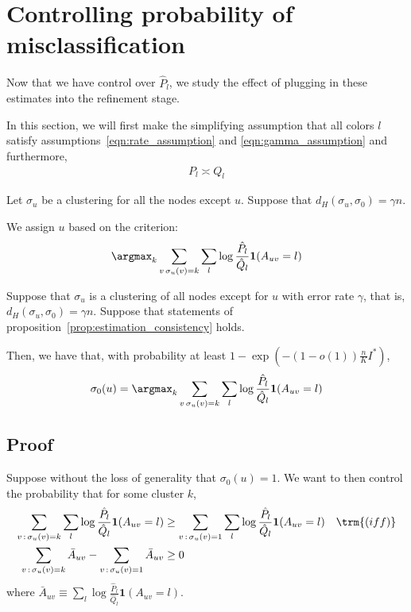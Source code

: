 \documentclass{article}
\begin{document}
\newpage
\section{Controlling probability of misclassification}
\label{sec:misclassify}

Now that we have control over $\hat{P}_l$, we study the effect of plugging in these estimates into the refinement stage.

\begin{shaded}
In this section, we will first make the simplifying assumption that all colors $l$ satisfy assumptions~\ref{eqn:rate_assumption} and \ref{eqn:gamma_assumption} and furthermore, 
\begin{align}
P_l \asymp Q_l \label{eqn:Pl_Ql_equiv}
\end{align}
\end{shaded}



Let $\sigma_u$ be a clustering for all the nodes except $u$. Suppose that $d_H(\sigma_u, \sigma_0) = \gamma n$. 


We assign $u$ based on the criterion:
\[
\argmax_k \sum_{v\, \sigma_u(v)=k} \sum_l \log \frac{\hat{P}_l}{\hat{Q}_l} \mathbf{1}(A_{uv} = l) 
\]

\begin{shaded}
\begin{proposition}
Suppose that $\sigma_u$ is a clustering of all nodes except for $u$ with error rate $\gamma$, that is, $d_H(\sigma_u, \sigma_0) = \gamma n$. Suppose that statements of proposition~\ref{prop:estimation_consistency} holds. 

Then, we have that, with probability at least $1 - \exp \left( - (1 - o(1)) \frac{n}{K} I^* \right)$, 
\[
\sigma_0(u) = \argmax_k \sum_{v\, \sigma_u(v)=k} \sum_l \log \frac{\hat{P}_l}{\hat{Q}_l} \mathbf{1}(A_{uv} = l) 
\]

\end{proposition}
\end{shaded}

\subsection{Proof}

Suppose without the loss of generality that $\sigma_0(u) = 1$.  We want to then control the probability that for some cluster $k$, 
\begin{align}
\sum_{v\,:\, \sigma_u(v)=k} \sum_l \log \frac{\hat{P}_l}{\hat{Q}_l} \mathbf{1}(A_{uv} = l) 
&\geq 
 \sum_{v\,:\, \sigma_u(v)=1} \sum_l \log \frac{\hat{P}_l}{\hat{Q}_l} \mathbf{1}(A_{uv} = l) 
  \quad \trm{(iff)}  \nonumber \\
\sum_{v \,:\, \sigma_u(v) = k} \bar{A}_{uv} - \sum_{v\,:\, \sigma_u(v) = 1} \bar{A}_{uv} 
\label{eqn:bad_event1}
&\geq 0 
\end{align}
where $\bar{A}_{uv} \equiv \sum_l \log \frac{\hat{P}_l}{\hat{Q}_l} \mathbf{1}(A_{uv} = l)$.
\end{document}
